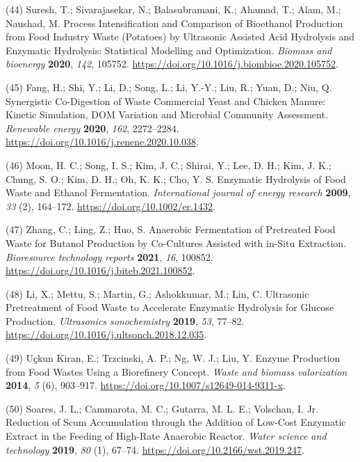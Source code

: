 \documentclass[11pt]{report}
\begin{document}
\hypertarget{citeproc_bib_item_44}{(44) Suresh, T.; Sivarajasekar, N.; Balasubramani, K.; Ahamad, T.; Alam, M.; Naushad, M. Process Intensification and Comparison of Bioethanol Production from Food Industry Waste (Potatoes) by Ultrasonic Assisted Acid Hydrolysis and Enzymatic Hydrolysis: Statistical Modelling and Optimization. \textit{Biomass and bioenergy} \textbf{2020}, \textit{142}, 105752. \url{https://doi.org/10.1016/j.biombioe.2020.105752}.}

\hypertarget{citeproc_bib_item_45}{(45) Fang, H.; Shi, Y.; Li, D.; Song, L.; Li, Y.-Y.; Liu, R.; Yuan, D.; Niu, Q. Synergistic Co-Digestion of Waste Commercial Yeast and Chicken Manure: Kinetic Simulation, DOM Variation and Microbial Community Assessment. \textit{Renewable energy} \textbf{2020}, \textit{162}, 2272–2284. \url{https://doi.org/10.1016/j.renene.2020.10.038}.}

\hypertarget{citeproc_bib_item_46}{(46) Moon, H. C.; Song, I. S.; Kim, J. C.; Shirai, Y.; Lee, D. H.; Kim, J. K.; Chung, S. O.; Kim, D. H.; Oh, K. K.; Cho, Y. S. Enzymatic Hydrolysis of Food Waste and Ethanol Fermentation. \textit{International journal of energy research} \textbf{2009}, \textit{33} (2), 164–172. \url{https://doi.org/10.1002/er.1432}.}

\hypertarget{citeproc_bib_item_47}{(47) Zhang, C.; Ling, Z.; Huo, S. Anaerobic Fermentation of Pretreated Food Waste for Butanol Production by Co-Cultures Assisted with in-Situ Extraction. \textit{Bioresource technology reports} \textbf{2021}, \textit{16}, 100852. \url{https://doi.org/10.1016/j.biteb.2021.100852}.}

\hypertarget{citeproc_bib_item_48}{(48) Li, X.; Mettu, S.; Martin, G.; Ashokkumar, M.; Lin, C. Ultrasonic Pretreatment of Food Waste to Accelerate Enzymatic Hydrolysis for Glucose Production. \textit{Ultrasonics sonochemistry} \textbf{2019}, \textit{53}, 77–82. \url{https://doi.org/10.1016/j.ultsonch.2018.12.035}.}

\hypertarget{citeproc_bib_item_49}{(49) Uçkun Kiran, E.; Trzcinski, A. P.; Ng, W. J.; Liu, Y. Enzyme Production from Food Wastes Using a Biorefinery Concept. \textit{Waste and biomass valorization} \textbf{2014}, \textit{5} (6), 903–917. \url{https://doi.org/10.1007/s12649-014-9311-x}.}

\hypertarget{citeproc_bib_item_50}{(50) Soares, J. L.; Cammarota, M. C.; Gutarra, M. L. E.; Volschan, I. Jr. Reduction of Scum Accumulation through the Addition of Low-Cost Enzymatic Extract in the Feeding of High-Rate Anaerobic Reactor. \textit{Water science and technology} \textbf{2019}, \textit{80} (1), 67–74. \url{https://doi.org/10.2166/wst.2019.247}.}
\end{document}
